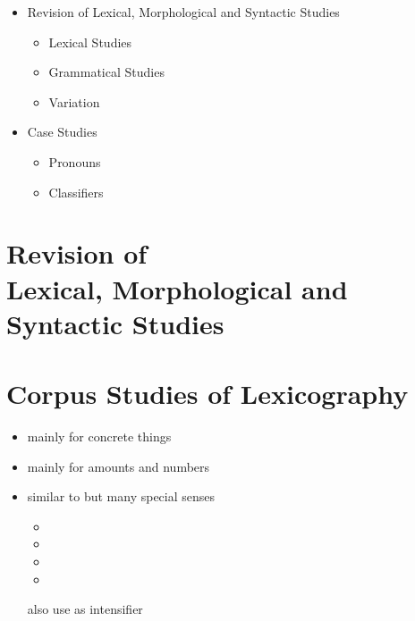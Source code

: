 \documentclass[a4paper,landscape,headrule,footrule,dvips]{foils}
\begin{document}
\begin{CJK}{UTF8}{min}

\maketitle



\begin{itemize} 
\item Revision of Lexical, Morphological and Syntactic Studies
  \begin{itemize} 
  \item Lexical Studies
  \item Grammatical Studies
  \item Variation
  \end{itemize}
\item Case Studies
  \begin{itemize}
  \item Pronouns
  \item Classifiers
  \end{itemize}
\end{itemize}


\section{Revision of \\
Lexical, Morphological and Syntactic Studies}

\section{Corpus Studies of Lexicography}

\begin{itemize}
\item {}  mainly for concrete things
\item {}  mainly for amounts and numbers
\item {} similar to  but many special senses
  \begin{itemize}
  \item {}  
  \item {}  
  \item {}
  \item {} 
  \end{itemize}
also use as intensifier 
\end{itemize}


\end{CJK}
\end{document}
